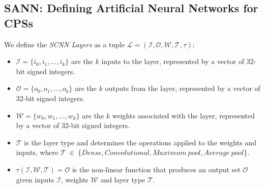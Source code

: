 

\subsection{\ac{SANN}: Defining Artificial Neural Networks for \acp{CPS}}
\begin{definition}
	\label{def:layer}We define the \emph{\ac{SCNN} Layers} as a tuple $\mathcal{L} = (\mathcal{I}, \mathcal{O}, \mathcal{W}, \mathcal{T}, \tau)$:
	\begin{itemize}
		\item $\mathcal{I} = \{i_0, i_1, ..., i_k \}$ are the $k$ inputs to the layer, represented by a vector of 32-bit signed integers.
		\item $\mathcal{O} = \{o_0, o_1, ..., o_k \}$ are the $k$ outputs from the layer, represented by a vector of 32-bit signed integers.
		\item $\mathcal{W} = \{w_0, w_1, ..., w_k\}$ are the $k$ weights associated with the layer, represented by a vector of 32-bit signed integers.
		\item $\mathcal{T}$ is the layer type and determines the operations applied to the weights and inputs, where $\mathcal{T}~\in~\{Dense, Convolutional, Maximum~pool, Average~pool\}$.
		\item $\tau(\mathcal{I}, \mathcal{W}, \mathcal{T}) = \mathcal{O}$ is the non-linear function that produces an output set $\mathcal{O}$ given inputs $\mathcal{I}$, weights $\mathcal{W}$ and layer type $\mathcal{T}$. 
	\end{itemize}
\end{definition}

